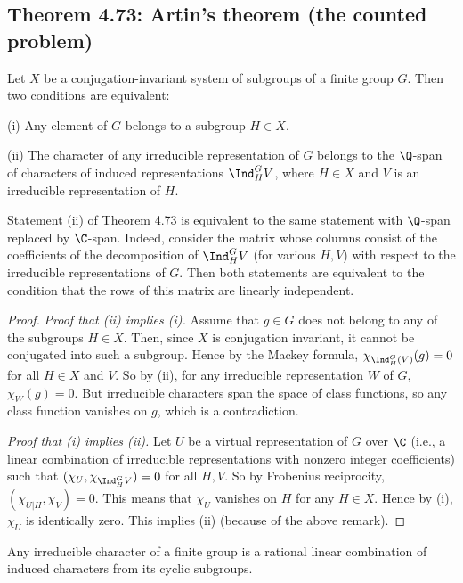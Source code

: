 \subsection*{Theorem 4.73: Artin's theorem (the counted problem)}
\begin{theorem}[4.73]
Let $X$ be a conjugation-invariant system of subgroups of a finite group $G$. Then two conditions are equivalent:

(i) Any element of $G$ belongs to a subgroup $H\in X$.

(ii) The character of any irreducible representation of $G$ belongs to the $\Q$-span of characters of induced representations $\Ind_H^G V$, where $H\in X$ and $V$ is an irreducible representation of $H$.
\end{theorem}
\begin{remark}
Statement (ii) of Theorem 4.73 is equivalent to the same statement with $\Q$-span replaced by $\C$-span. Indeed, consider the matrix whose columns consist of the coefficients of the decomposition of $\Ind_H^G V$ (for various $H,V$) with respect to the irreducible representations of $G$. Then both statements are equivalent to the condition that the rows of this matrix are linearly independent.
\end{remark}
\begin{proof}
\emph{Proof that (ii) implies (i).} Assume that $g\in G$ does not belong to any of the subgroups $H\in X$. Then, since $X$ is conjugation invariant, it cannot be conjugated into such a subgroup. Hence by the Mackey formula, $\chi_{\Ind_H^G(V)}(g)=0$ for all $H\in X$ and $V$. So by (ii), for any irreducible representation $W$ of $G$, $\chi_W(g)=0$. But irreducible characters span the space of class functions, so any class function vanishes on $g$, which is a contradiction.

\emph{Proof that (i) implies (ii).} Let $U$ be a virtual representation of $G$ over $\C$ (i.e., a linear combination of irreducible representations with nonzero integer coefficients) such that $(\chi_U,\chi_{\Ind_H^G V})=0$ for all $H,V$. So by Frobenius reciprocity, $(\chi_{U|H},\chi_V)=0$. This means that $\chi_U$ vanishes on $H$ for any $H\in X$. Hence by (i), $\chi_U$ is identically zero. This implies (ii) (because of the above remark).
\end{proof}
\begin{corollary}[4.74]
Any irreducible character of a finite group is a rational linear combination of induced characters from its cyclic subgroups.
\end{corollary}
